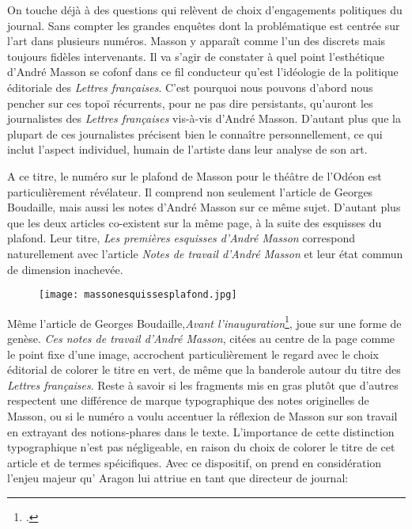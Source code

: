 
On touche déjà à des questions qui relèvent de choix d’engagements politiques du journal. Sans compter les grandes enquêtes dont la problématique est centrée sur l’art dans plusieurs numéros. Masson y apparaît comme l’un des discrets mais toujours fidèles intervenants. Il va s’agir de constater à quel point l’esthétique d’André Masson se cofonf dans ce fil conducteur qu'est l’idéologie de la politique éditoriale des \emph{Lettres françaises}. C’est pourquoi nous pouvons d’abord nous pencher sur ces topoï récurrents, pour ne pas dire persistants, qu’auront les journalistes des \emph{Lettres françaises} vis-à-vis d’André Masson. D’autant plus que la plupart de ces journalistes précisent bien le connaître personnellement, ce qui inclut l’aspect individuel, humain de l’artiste dans leur analyse de son art.

	A ce titre, le numéro sur le plafond de Masson pour le théâtre de l’Odéon est particulièrement révélateur. Il comprend non seulement l’article de Georges Boudaille, mais aussi les notes d’André Masson sur ce même sujet. D’autant plus que les deux articles co-existent sur la même page, à la suite des esquisses du plafond. Leur titre, \emph{Les premières esquisses d’André Masson} correspond naturellement avec l’article \emph{Notes de travail d’André Masson} et leur état commun de dimension inachevée. 

	\begin{figure}[H]
   \centering
   \texttt{[image: massonesquissesplafond.jpg]}
	\caption{\cite{plafondodeon}}\label{fig:Notesdetravail}
\end{figure}



Même l’article de Georges Boudaille,\emph{Avant l’inauguration}\footcite{avantinauguration}, joue sur une forme de genèse. \emph{Ces notes de travail d’André Masson}, citées au centre de la page comme le point fixe d’une image, accrochent particulièrement le regard avec le choix éditorial de colorer le titre en vert, de même que la banderole autour du titre des \emph{Lettres françaises}. Reste à savoir si les fragments mis en gras plutôt que d’autres respectent une différence de marque typographique des notes originelles de Masson, ou si le numéro a voulu accentuer la réflexion de Masson sur son travail en extrayant des notions-phares dans le texte. L’importance de cette distinction typographique n’est pas négligeable, en raison du choix de colorer le titre de cet article et de termes spéicifiques. Avec ce dispositif, on prend en considération l’enjeu majeur qu’ Aragon lui attriue en tant que directeur de journal: 

